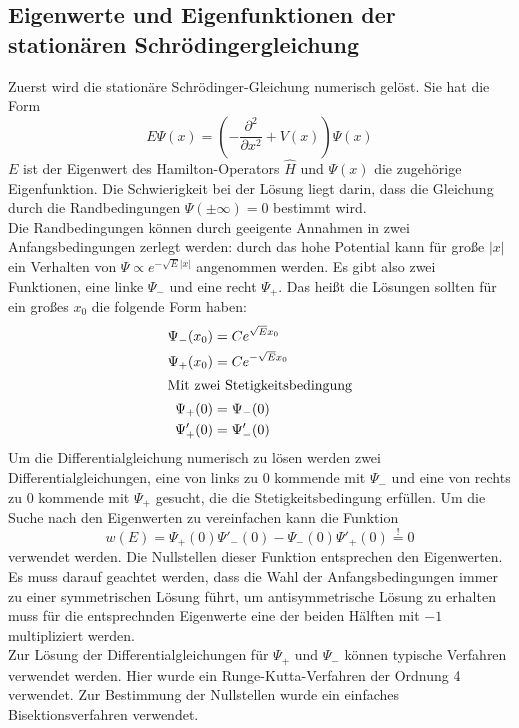 \documentclass[a4paper, 11pt]{scrartcl}
\begin{document}
\subsection{Eigenwerte und Eigenfunktionen der stationären Schrödingergleichung} \label{sec:stat}
Zuerst wird die stationäre Schrödinger-Gleichung numerisch gelöst. Sie hat die Form
%
\begin{equation}
E \Psi(x) = \left( - \frac{\partial^2}{\partial x^2}  + V(x) \right) \Psi(x)
\end{equation}
%
$E$ ist der Eigenwert des Hamilton-Operators $\hat{H}$ und $\Psi(x)$ die zugehörige Eigenfunktion. Die Schwierigkeit bei der Lösung liegt darin, dass die Gleichung durch die Randbedingungen $\Psi(\pm \infty) = 0$ bestimmt wird.\\
Die Randbedingungen können durch geeigente Annahmen in zwei Anfangsbedingungen zerlegt werden: durch das hohe Potential kann für große $\vert x \vert$ ein Verhalten von $\Psi \propto e^{- \sqrt{E} \vert x \vert}$ angenommen werden. Es gibt also zwei Funktionen, eine linke $\Psi_{-}$ und eine  recht  $\Psi_{+}$. Das heißt die Lösungen sollten für ein großes $x_0$ die folgende Form haben:
%
\begin{align}
\Psi_{-}(x_0) & = C e^{ \sqrt{E} x_0} \\
\Psi_{+}(x_0) & = C e^{- \sqrt{E} x_0} \\
\intertext{Mit zwei Stetigkeitsbedingung}
\Psi_{+}(0) & = \Psi_{-}(0) \\
\Psi'_{+}(0) & = \Psi'_{-}(0)
\end{align}
%
Um die Differentialgleichung numerisch zu lösen werden zwei Differentialgleichungen, eine von links zu $0$ kommende mit $\Psi_{-}$ und eine von rechts zu $0$ kommende mit $\Psi_{+}$ gesucht, die die Stetigkeitsbedingung erfüllen. Um die Suche nach den Eigenwerten zu vereinfachen kann die Funktion
%
\begin{equation}
w(E) = \Psi_{+}(0)\Psi'_{-}(0) - \Psi_{-}(0)\Psi'_{+}(0) \stackrel{!}{=} 0
\end{equation}
%
verwendet werden. Die Nullstellen dieser Funktion entsprechen den Eigenwerten. Es muss darauf geachtet werden, dass die Wahl der Anfangsbedingungen immer zu einer symmetrischen Lösung führt, um antisymmetrische Lösung zu erhalten muss für die entsprechnden Eigenwerte eine der beiden Hälften mit $-1$ multipliziert werden.\\
Zur Lösung der Differentialgleichungen für $\Psi_{+}$ und $\Psi_{-}$ können typische Verfahren verwendet werden. Hier wurde ein Runge-Kutta-Verfahren der Ordnung 4 verwendet. Zur Bestimmung der Nullstellen wurde ein einfaches Bisektionsverfahren verwendet.
%
\end{document}
